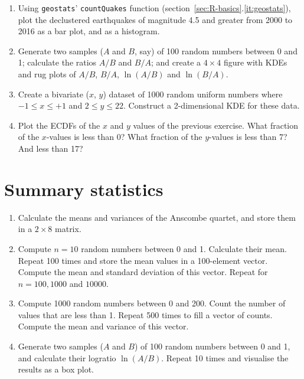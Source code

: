 \begin{enumerate}
  
\item Using \texttt{geostats}' \texttt{countQuakes} function
  (section~\ref{sec:R-basics}.\ref{it:geostats}), plot the declustered
  earthquakes of magnitude 4.5 and greater from 2000 to 2016 as a bar
  plot, and as a histogram.

\item\label{it:AB} Generate two samples ($A$ and $B$, say) of 100
  random numbers between 0 and 1; calculate the ratios $A/B$ and
  $B/A$; and create a ${4}\times{4}$ figure with KDEs and rug plots of
  $A/B$, $B/A$, $\ln(A/B)$ and $\ln(B/A)$.
  
\item\label{it:randxy} Create a bivariate ($x$, $y$) dataset of 1000
  random uniform numbers where $-1\leq{x}\leq{+1}$ and
  $2\leq{y}\leq{22}$. Construct a 2-dimensional KDE for these data.
  
\item Plot the ECDFs of the $x$ and $y$ values of the previous
  exercise. What fraction of the $x$-values is less than 0?  What
  fraction of the $y$-values is less than 7? And less than 17?

\end{enumerate}

\section{Summary statistics}
\label{sec:ex-summary-statistics}

\begin{enumerate}
  
\item Calculate the means and variances of the Anscombe quartet, and
  store them in a ${2}\times{8}$ matrix.

\item Compute $n=10$ random numbers between 0 and 1. Calculate their
  mean. Repeat 100 times and store the mean values in a 100-element
  vector. Compute the mean and standard deviation of this vector.
  Repeat for $n=100, 1000$ and $10000$.

\item Compute 1000 random numbers between 0 and 200. Count the number
  of values that are less than 1. Repeat 500 times to fill a vector of
  counts. Compute the mean and variance of this vector.
  
\item Generate two samples ($A$ and $B$) of 100 random numbers between
  0 and 1, and calculate their logratio $\ln(A/B)$. Repeat 10 times
  and visualise the results as a box plot.

\end{enumerate}


